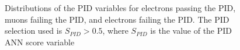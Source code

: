\begin{figure}
   {
    \label{fig:electrons_failing_pid}
    Distributions of the PID variables for electrons passing the PID, muons failing the PID, and electrons failing the PID.
    The PID selection used is $S_{PID} > 0.5$, where $S_{PID}$ is the value of the PID ANN score variable
  }
\end{figure}
